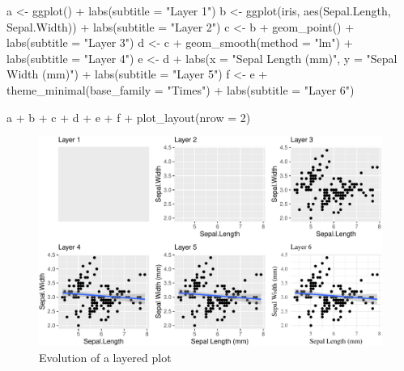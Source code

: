 \documentclass[
  english,
  doc,floatsintext]{apa6}
\newenvironment{Shaded}{\begin{snugshade}}{\end{snugshade}}
\newcommand{\AttributeTok}[1]{\textcolor[rgb]{0.77,0.63,0.00}{#1}}
\newcommand{\DecValTok}[1]{\textcolor[rgb]{0.00,0.00,0.81}{#1}}
\newcommand{\FunctionTok}[1]{\textcolor[rgb]{0.00,0.00,0.00}{#1}}
\newcommand{\NormalTok}[1]{#1}
\newcommand{\OtherTok}[1]{\textcolor[rgb]{0.56,0.35,0.01}{#1}}
\newcommand{\SpecialCharTok}[1]{\textcolor[rgb]{0.00,0.00,0.00}{#1}}
\newcommand{\StringTok}[1]{\textcolor[rgb]{0.31,0.60,0.02}{#1}}
\begin{document}
\begin{Shaded}
\begin{Highlighting}[]
\NormalTok{a }\OtherTok{\textless{}{-}} \FunctionTok{ggplot}\NormalTok{() }\SpecialCharTok{+} \FunctionTok{labs}\NormalTok{(}\AttributeTok{subtitle =} \StringTok{"Layer 1"}\NormalTok{)}
\NormalTok{b }\OtherTok{\textless{}{-}} \FunctionTok{ggplot}\NormalTok{(iris, }\FunctionTok{aes}\NormalTok{(Sepal.Length, Sepal.Width)) }\SpecialCharTok{+} \FunctionTok{labs}\NormalTok{(}\AttributeTok{subtitle =} \StringTok{"Layer 2"}\NormalTok{)}
\NormalTok{c }\OtherTok{\textless{}{-}}\NormalTok{ b }\SpecialCharTok{+} \FunctionTok{geom\_point}\NormalTok{() }\SpecialCharTok{+} \FunctionTok{labs}\NormalTok{(}\AttributeTok{subtitle =} \StringTok{"Layer 3"}\NormalTok{)}
\NormalTok{d }\OtherTok{\textless{}{-}}\NormalTok{ c }\SpecialCharTok{+} \FunctionTok{geom\_smooth}\NormalTok{(}\AttributeTok{method =} \StringTok{"lm"}\NormalTok{) }\SpecialCharTok{+} \FunctionTok{labs}\NormalTok{(}\AttributeTok{subtitle =} \StringTok{"Layer 4"}\NormalTok{)}
\NormalTok{e }\OtherTok{\textless{}{-}}\NormalTok{ d }\SpecialCharTok{+} \FunctionTok{labs}\NormalTok{(}\AttributeTok{x =} \StringTok{"Sepal Length (mm)"}\NormalTok{, }\AttributeTok{y =} \StringTok{"Sepal Width (mm)"}\NormalTok{) }\SpecialCharTok{+} \FunctionTok{labs}\NormalTok{(}\AttributeTok{subtitle =} \StringTok{"Layer 5"}\NormalTok{)}
\NormalTok{f }\OtherTok{\textless{}{-}}\NormalTok{ e }\SpecialCharTok{+} \FunctionTok{theme\_minimal}\NormalTok{(}\AttributeTok{base\_family =} \StringTok{"Times"}\NormalTok{) }\SpecialCharTok{+} \FunctionTok{labs}\NormalTok{(}\AttributeTok{subtitle =} \StringTok{"Layer 6"}\NormalTok{)}

\NormalTok{a }\SpecialCharTok{+}\NormalTok{ b }\SpecialCharTok{+}\NormalTok{ c }\SpecialCharTok{+}\NormalTok{ d }\SpecialCharTok{+}\NormalTok{ e }\SpecialCharTok{+}\NormalTok{ f }\SpecialCharTok{+} \FunctionTok{plot\_layout}\NormalTok{(}\AttributeTok{nrow =} \DecValTok{2}\NormalTok{)}
\end{Highlighting}
\end{Shaded}

\begin{figure}

{\centering \includegraphics[width=1\linewidth]{images/layers-1} 

}

\caption{Evolution of a layered plot}\label{fig:layers}
\end{figure}
\end{document}
